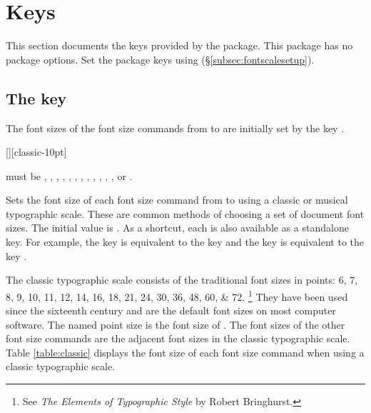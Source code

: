 \documentclass{beery}
\begin{document}
\section{Keys}
\label{sec:keys}

This section documents the keys provided by the  package.
This package has no package options.
Set the package keys using  (\S\ref{subsec:fontscalesetup}).

\subsection{The key }
\label{subsec:typographicscale}

The font sizes of the font size commands from  to  are initially set by the key .

\begin{displaycode}
  [][classic-10pt]
\end{displaycode}

 must be , , , , , , , , , , , , or .

Sets the font size of each font size command from  to  using a classic or musical typographic scale.
These are common methods of choosing a set of document font sizes.
The initial value is .
As a shortcut, each  is also available as a standalone key.
For example, the key  is equivalent to the key  and the key  is equivalent to the key .

The classic typographic scale consists of the traditional font sizes in points:
\numlist{6;7;8;9;10;11;12;14;16;18;21;24;30;36;48;60;72}.%
\footnote{See \textit{The Elements of Typographic Style} by Robert Bringhurst.}
They have been used since the sixteenth century and are the default font sizes on most computer software.
The named point size is the font size of .
The font sizes of the other font size commands are the adjacent font sizes in the classic typographic scale.
Table \ref{table:classic} displays the font size of each font size command when using a classic typographic scale.
\end{document}
